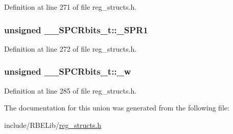 Definition at line 271 of file reg\+\_\+structs.\+h.

\hypertarget{union_____s_p_c_rbits__t_a6d4c0532d6c61dfe6a9fc6e86366c716}{
\subsubsection[{\+\_\+\+S\+P\+R1}]{\setlength{\rightskip}{0pt plus 5cm}unsigned \+\_\+\+\_\+\+S\+P\+C\+Rbits\+\_\+t\+::\+\_\+\+S\+P\+R1}}\label{union_____s_p_c_rbits__t_a6d4c0532d6c61dfe6a9fc6e86366c716}


Definition at line 272 of file reg\+\_\+structs.\+h.

\hypertarget{union_____s_p_c_rbits__t_a06eaabae6fda9f686e280e845a46dadd}{
\subsubsection[{\+\_\+w}]{\setlength{\rightskip}{0pt plus 5cm}unsigned \+\_\+\+\_\+\+S\+P\+C\+Rbits\+\_\+t\+::\+\_\+w}}\label{union_____s_p_c_rbits__t_a06eaabae6fda9f686e280e845a46dadd}


Definition at line 285 of file reg\+\_\+structs.\+h.



The documentation for this union was generated from the following file\+:\begin{DoxyCompactItemize}
\item 
include/\+R\+B\+E\+Lib/\hyperlink{reg__structs_8h}{reg\+\_\+structs.\+h}\end{DoxyCompactItemize}
